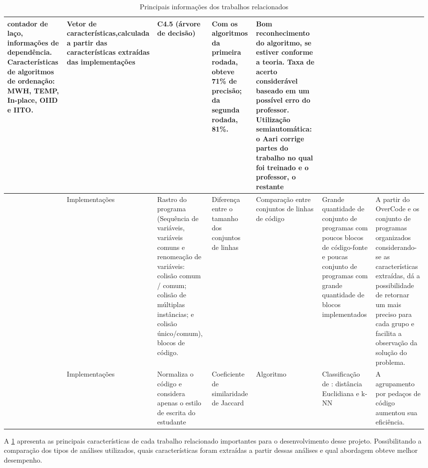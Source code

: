 \begin{landscape}
\begin{table}[h]
\begin{tabularx}{\linewidth}{ |X|X|X|X|X|X|X| }
					contador de laço, informações de dependência. Características de algoritmos
					de ordenação: MWH, TEMP, In-place, OIID e IITO.
					& Vetor de características,calculada a partir das características extraídas
					das implementações
					& C4.5 (árvore de decisão)
					& Com os algoritmos da primeira rodada, obteve 71\% de precisão; da
					segunda rodada, 81\%.
					& Bom reconhecimento do algoritmo, se estiver conforme a teoria. Taxa de
					acerto considerável baseado em um possível erro do professor. Utilização
					semiautomática: o Aari corrige partes do trabalho no qual foi treinado e
					o professor, o restante \\
					\hline %
					\citeonline{Glassman:2015,glassman2016clustering,glassman2014interacting,glassman2013toward,glassman2013visualizing}
					& Implementações
					& Rastro do programa (Sequência de variáveis, variáveis comuns e
					renomeação de variáveis: colisão comum / comum; colisão de múltiplas
					instâncias; e colisão único/comum), blocos de código.
					& Diferença entre o tamanho dos conjuntos de linhas
					& Comparação entre conjuntos de linhas de código
					& Grande quantidade de conjunto de programas com poucos blocos de código-fonte e poucas
					conjunto de programas com grande quantidade de blocos implementados
					& A partir do OverCode e os conjunto de programas organizados considerando-se as
					características extraídas, dá a possibilidade de retornar um
					\foreign{feedback} mais preciso para cada grupo e facilita a observação
					da solução do problema. \\
					\hline %
					\citeonline{Wei2015}
					& Implementações
					& Normaliza o código e considera apenas o estilo de escrita do estudante
					& Coeficiente de similaridade de Jaccard
					& Algoritmo \foreign{Winnowing}
					& Classificação de \foreign{workload}: distância Euclidiana e k-NN
					& A agrupamento por pedaços de código aumentou sua eficiência. \\
					\hline
				\end{tabularx}
				\caption{Principais informações dos trabalhos relacionados}
				\label{tab:caracPrinc}
			\end{table}
		\end{landscape}
		
		A \cref{tab:caracPrinc} apresenta as principais características de cada trabalho
		relacionado importantes para o desenvolvimento desse projeto. Possibilitando a
		comparação dos tipos de análises utilizados, quais características foram
		extraídas a partir dessas análises e qual abordagem obteve melhor desempenho.
		
